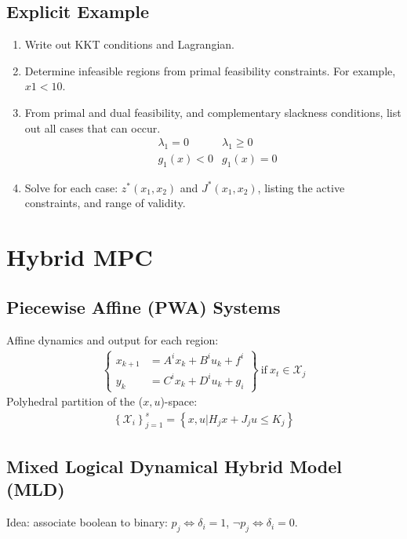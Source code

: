 \documentclass[landscape,a4paper,8pt]{scrartcl}
\newcommand{\mc}[1]{\mathcal{#1}}
\newcommand{\Mg}[1]{\begin{Bmatrix}#1\end{Bmatrix}} %
\begin{document}
\begin{multicols*}{3}
\subsection{Explicit Example}
\begin{enumerate}
 \itemsep0em
 \item Write out KKT conditions and Lagrangian.
 \item Determine infeasible regions from primal feasibility constraints. For example, $x1 < 10$.
 \item From primal and dual feasibility, and complementary slackness conditions, list out all cases that can occur.
 \begin{align*}
  &\lambda_1 = 0 &\lambda_1 \geq 0\\
  & g_1(x) < 0 &g_1(x) = 0
 \end{align*}
 \item Solve for each case: $z^*(x_1, x_2)$ and $J^*(x_1, x_2)$, listing the active constraints, and range of validity.
\end{enumerate}

\section{Hybrid MPC}
\subsection{Piecewise Affine (PWA) Systems}
Affine dynamics and output for each region:
\begin{align*}
\Mg{x_{k+1} &= A^i x_k + B^i u_k + f^i \\ y_k &= C^i x_k + D^i u_k + g_i} \mathrm{~if~} x_t \in \mc{X}_j
\end{align*}
Polyhedral partition of the ($x,u$)-space:
\begin{align*}
\left\{\mc{X}_i\right\}_{j=1}^s = \left\{x,u| H_j x + J_j u \leq K_j\right\}
\end{align*}

\subsection{Mixed Logical Dynamical Hybrid Model (MLD)}
Idea: associate boolean to binary: $ p_j \iff \delta_i = 1$, $\neg p_j \iff \delta_i =0$.

\end{multicols*}
\end{document}
